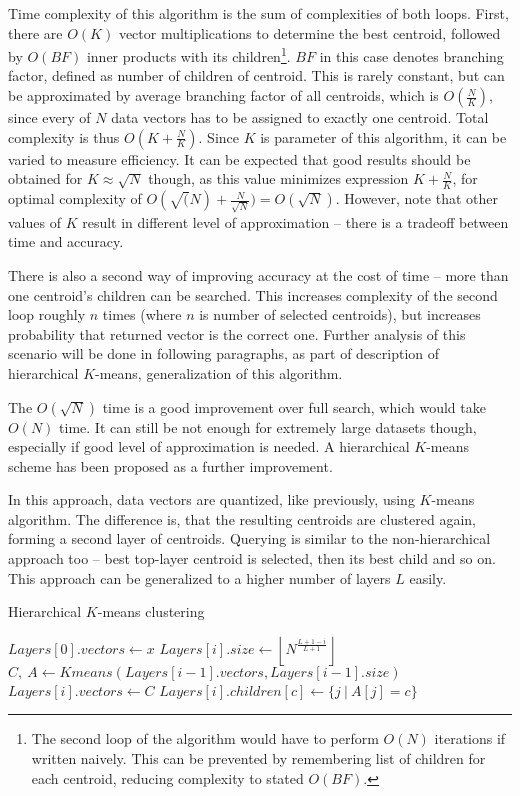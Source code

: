 Time complexity of this algorithm is the sum of complexities of both loops.
First, there are $O(K)$ vector multiplications to determine the best centroid,
followed by $O(BF)$ inner products with its children\footnote{The second loop
of the algorithm would have to perform $O(N)$ iterations if written naively.
This can be prevented by remembering list of children for each centroid,
reducing complexity to stated $O(BF)$.}.
$BF$ in this case denotes
branching factor, defined as number of children of centroid. This is rarely
constant, but can be approximated by average branching factor of all centroids,
which is $O(\frac{N}{K})$, since every of $N$ data vectors has to be assigned
to exactly one centroid. Total complexity is thus $O(K + \frac{N}{K})$. Since
$K$ is parameter of this algorithm, it can be varied to measure efficiency. It
can be expected that good results should be obtained for $K \approx \sqrt{N}$ 
though, as this value minimizes expression $K + \frac{N}{K}$, for optimal
complexity of $O(\sqrt(N) + \frac{N}{\sqrt{N}}) = O(\sqrt{N})$. However, note that other
values of $K$ result in different level of approximation -- there is
a tradeoff between time and accuracy. 

There is also a second way of improving accuracy at the cost of time -- more
than one centroid's children can be searched. This increases complexity of the
second loop roughly $n$ times (where $n$ is number of selected centroids),
but increases probability that returned vector is the correct one. Further
analysis of this scenario will be done in following paragraphs, as part
of description of hierarchical $K$-means, generalization of this algorithm.


\bigskip


The $O(\sqrt{N})$ time is a good improvement over full search, which would
take $O(N)$ time. It can still be not enough for extremely large datasets
though, especially if good level of approximation is needed. A hierarchical
$K$-means scheme has been proposed as a further improvement.

In this approach, data vectors are quantized, like previously,
using $K$-means algorithm.
The difference is, that the resulting centroids are clustered again, forming
a second layer of centroids. Querying is similar to the non-hierarchical
approach too -- best top-layer centroid is selected, then its best child and
so on. This approach can be generalized to a higher number of layers $L$ 
easily.


\begin{algorithm}[H]
	\caption{Hierarchical $K$-means clustering}
	\begin{algorithmic}
		\State $ Layers[0].vectors \gets x $
			\State $ Layers[i].size \gets \left \lfloor N^{\frac{L + 1 - i}{L + 1}} \right \rfloor $
			\State $ C,\ A \gets Kmeans(Layers[i - 1].vectors, Layers[i - 1].size) $
			\State $ Layers[i].vectors \gets C $
				\State $ Layers[i].children[c] \gets \{ j\ |\ A[j] = c \} $
			\EndFor
		\EndFor
		\State {}
	\end{algorithmic}
\end{algorithm}

